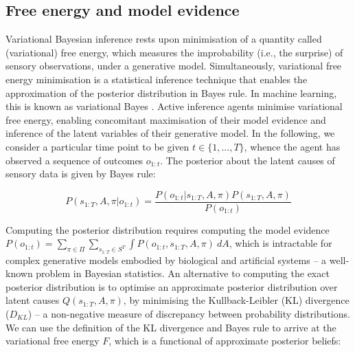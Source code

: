 \documentclass[review,12pt,authoryear]{elsarticle}
\begin{document}
\subsection{Free energy and model evidence}

Variational Bayesian inference rests upon minimisation of a quantity called (variational) free energy, which measures the improbability (i.e., the surprise) of sensory observations, under a generative model. Simultaneously, variational free energy minimisation is a statistical inference technique that enables the approximation of the posterior distribution in Bayes rule. In machine learning, this is known as variational Bayes \citep{bishopPatternRecognitionMachine2006,jordanIntroductionVariationalMethods1998,bealVariationalAlgorithmsApproximate2003,bleiVariationalInferenceReview2017}.
Active inference agents minimise variational free energy, enabling concomitant maximisation of their model evidence and inference of the latent variables of their generative model. In the following, we consider a particular time point to be given $t\in\{1,...,T\}$, whence the agent has observed a sequence of outcomes $o_{1:t}$. The posterior about the latent causes of sensory data is given by Bayes rule:
  	
  	\begin{equation}
  	\label{eq:bayes rule}
  	    P(s_{1:T}, A, \pi |o_{1:t})= \frac{P(o_{1:t} |s_{1:T}, A, \pi )P(s_{1:T}, A, \pi )}{P(o_{1:t})}
  	\end{equation}
  		
  		
Computing the posterior distribution requires computing the model evidence $P(o_{1:t})=\sum_{\pi \in \Pi }\sum_{s_{1:T}\in S^T}\int P(o_{1:t} ,s_{1:T}, A, \pi ) \: dA$, which is intractable for complex generative models embodied by biological and artificial systems \citep{fristonHierarchicalModelsBrain2008} -- a well-known problem in Bayesian statistics.
An alternative to computing the exact posterior distribution is to optimise an approximate posterior distribution over latent causes $Q(s_{1:T}, A, \pi)$, by minimising the Kullback-Leibler (KL) divergence \citep{kullbackInformationSufficiency1951} ($D_{KL}$) -- a non-negative measure of discrepancy between probability distributions. We can use the definition of the KL divergence and Bayes rule to arrive at the variational free energy $F$, which is a functional of approximate posterior beliefs:
\end{document}
